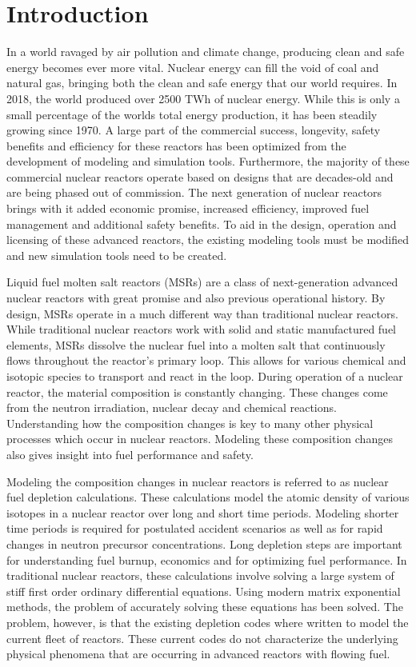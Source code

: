 \chapter{Introduction} \label{ch:introduction}

In a world ravaged by air pollution and climate change, producing clean and safe energy becomes ever more vital. Nuclear energy can fill the void of coal and natural gas, bringing both the clean and safe energy that our world requires. In 2018, the world produced over 2500 TWh of nuclear energy. While this is only a small percentage of the worlds total energy production, it has been steadily growing since 1970. A large part of the commercial success, longevity, safety benefits and efficiency for these reactors has been optimized from the development of modeling and simulation tools. Furthermore, the majority of these commercial nuclear reactors operate based on designs that are decades-old and are being phased out of commission. The next generation of nuclear reactors brings with it added economic promise, increased efficiency, improved fuel management and additional safety benefits. To aid in the design, operation and licensing of these advanced reactors, the existing modeling tools must be modified and new simulation tools need to be created. 
 
Liquid fuel molten salt reactors (MSRs) are a class of next-generation advanced nuclear reactors with great promise and also previous operational history. By design, MSRs operate in a much different way than traditional nuclear reactors. While traditional nuclear reactors work with solid and static manufactured fuel elements, MSRs dissolve the nuclear fuel into a molten salt that continuously flows throughout the reactor's primary loop. This allows for various chemical and isotopic species to transport and react in the loop. During operation of a nuclear reactor, the material composition is constantly changing. These changes come from the neutron irradiation, nuclear decay and chemical reactions. Understanding how the composition changes is key to many other physical processes which occur in nuclear reactors. Modeling these composition changes also gives insight into fuel performance and safety. 

Modeling the composition changes in nuclear reactors is referred to as nuclear fuel depletion calculations. These calculations model the atomic density of various isotopes in a nuclear reactor over long and short time periods. Modeling shorter time periods is required for postulated accident scenarios as well as for rapid changes in neutron precursor concentrations. Long depletion steps are important for understanding fuel burnup, economics and for optimizing fuel performance. In traditional nuclear reactors, these calculations involve solving a large system of stiff first order ordinary differential equations. Using modern matrix exponential methods, the problem of accurately solving these equations has been solved. The problem, however, is that the existing depletion codes where written to model the current fleet of reactors. These current codes do not characterize the underlying physical phenomena that are occurring in advanced reactors with flowing fuel. 

